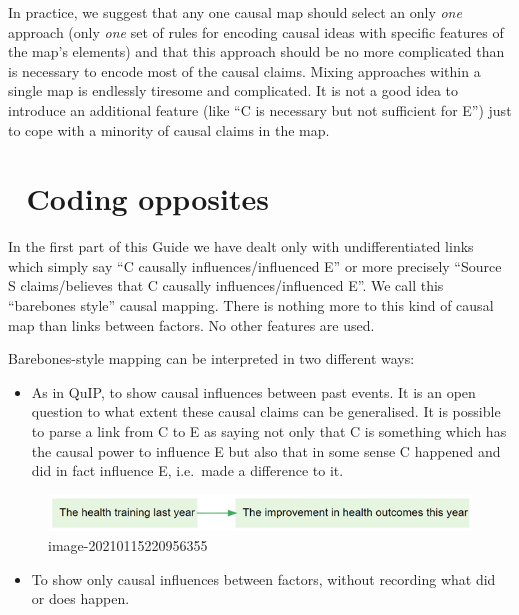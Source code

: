 \documentclass[
]{book}
\providecommand{\tightlist}{%
  \setlength{\itemsep}{0pt}\setlength{\parskip}{0pt}}
\begin{document}
In practice, we suggest that any one causal map should select an only \emph{one} approach (only \emph{one} set of rules for encoding causal ideas with specific features of the map's elements) and that this approach should be no more complicated than is necessary to encode most of the causal claims. Mixing approaches within a single map is endlessly tiresome and complicated. It is not a good idea to introduce an additional feature (like ``C is necessary but not sufficient for E'') just to cope with a minority of causal claims in the map.

\hypertarget{coding-opposites}{%
\chapter{🧠 Coding opposites}\label{coding-opposites}}

In the first part of this Guide we have dealt only with undifferentiated links which simply say ``C causally influences/influenced E'' or more precisely ``Source S claims/believes that C causally influences/influenced E''. We call this ``barebones style'' causal mapping. There is nothing more to this kind of causal map than links between factors. No other features are used.

Barebones-style mapping can be interpreted in two different ways:

\begin{itemize}
\tightlist
\item
  As in QuIP, to show causal influences between past events. It is an open question to what extent these causal claims can be generalised. It is possible to parse a link from C to E as saying not only that C is something which has the causal power to influence E but also that in some sense C happened and did in fact influence E, i.e.~made a difference to it.
\end{itemize}

\begin{figure}
\centering
\includegraphics{_assets/image-20210115220956355.png}
\caption{image-20210115220956355}
\end{figure}

\begin{itemize}
\tightlist
\item
  To show only causal influences between factors, without recording what did or does happen.
\end{itemize}
\end{document}
